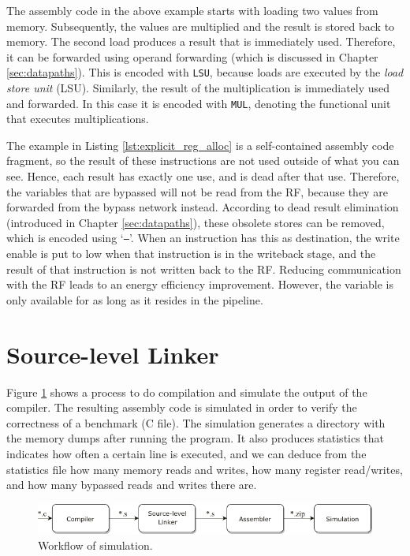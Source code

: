 The assembly code in the above example starts with loading two values from memory. Subsequently, the values are multiplied and the result is stored back to memory. The second load produces a result that is immediately used. Therefore, it can be forwarded using operand forwarding (which is discussed in Chapter \ref{sec:datapaths}). This is encoded with \texttt{LSU}, because loads are executed by the \emph{load store unit} (LSU). Similarly, the result of the multiplication is immediately used and forwarded. In this case it is encoded with \texttt{MUL}, denoting the functional unit that executes multiplications.

The example in Listing \ref{lst:explicit_reg_alloc} is a self-contained assembly code fragment, so the result of these instructions are not used outside of what you can see. Hence, each result has exactly one use, and is dead after that use. Therefore, the variables that are bypassed will not be read from the RF, because they are forwarded  from the bypass network instead. According to dead result elimination (introduced in Chapter \ref{sec:datapaths}), these obsolete stores can be removed, which is encoded using `\texttt{--}'. When an instruction has this as destination, the write enable is put to low when that instruction is in the writeback stage, and the result of that instruction is not written back to the RF. Reducing communication with the RF leads to an energy efficiency improvement. However, the variable is only available for as long as it resides in the pipeline. 

\section{Source-level Linker}
Figure \ref{fig:linker_A} shows a process to do compilation and simulate the output of the compiler. The resulting assembly code is simulated in order to verify the correctness of a benchmark (C file). The simulation generates a directory with the memory dumps after running the program. It also produces statistics that indicates how often a certain line is executed, and we can deduce from the statistics file how many memory reads and writes, how many register read/writes, and how many bypassed reads and writes there are.

\begin{figure}[H]
\centering
\includegraphics[width=.95\textwidth]{figures/linker_illustration1}
\caption{Workflow of simulation.}
\label{fig:linker_A}
\end{figure}

